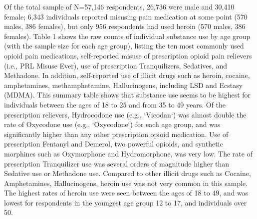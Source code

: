 \documentclass[sigconf]{acmart}
\begin{document}
Of the total sample of N=57,146 respondents, 26,736 were male and 30,410 
female; 6,343 individuals reported misusing pain medication at some point
(570 males, 386 females), but only 956 respondents had used heroin (570 males, 
386 females). Table 1 shows the raw counts of individual substance use by age 
group (with the sample size for each age group), listing the ten most commonly 
used opioid pain medications, self-reported misuse of prescription opioid pain 
relievers (i.e., PRL Misuse Ever), use of prescription Tranquilizers, Sedatives, 
and Methadone. In addition, self-reported use of illicit drugs such as heroin, 
cocaine, amphetamines, methamphetamine, Hallucinogens, including LSD and 
Ecstasy (MDMA). This summary table shows that substance use seems to be highest 
for individuals between the ages of 18 to 25 and from 35 to 49 years. Of the
prescription relievers, Hydrocodone use (e.g., `Vicodan`)  was almost double 
the rate of Oxycodone use (e.g., `Oxycodone`) for each age group, and was 
significantly higher than any other prescription opioid medication. Use of 
prescription Fentanyl and Demerol, two powerful opioids, and synthetic morphines 
such as Oxymorphone and Hydromorphone, was very low. The rate of prescription 
Tranquilizer use was several orders of magnitude higher than Sedative use or 
Methadone use. Compared to other illicit drugs such as Cocaine, Amphetamines, 
Hallucinogens, heroin use was not very common in this sample. The highest rates 
of heroin use were seen between the ages of 18 to 49, and was lowest for
respondents in the youngest age group 12 to 17, and individuals over 50. 
\end{document}
